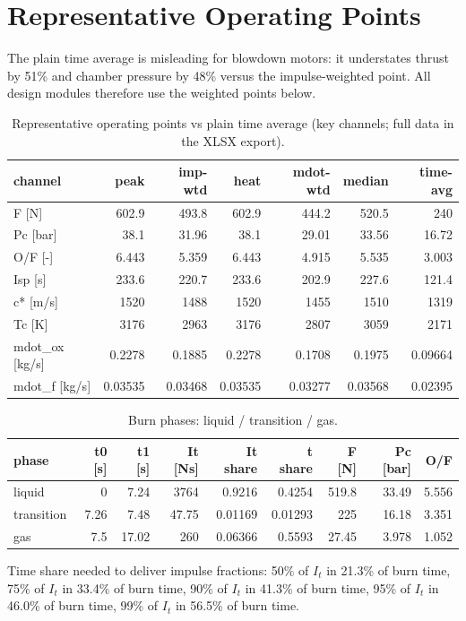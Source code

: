 \documentclass[11pt]{article}
\begin{document}
\section{Representative Operating Points}
The plain time average is misleading for blowdown motors: it understates thrust by 51\% and chamber pressure by 48\% versus the impulse-weighted point. All design modules therefore use the weighted points below.
\begin{table}[h!]\centering\small
\caption{Representative operating points vs plain time average (key channels; full data in the XLSX export).}
\begin{tabular}{lrrrrrr}\toprule
channel & peak & imp-wtd & heat & mdot-wtd & median & time-avg \\
\midrule
F [N] & 602.9 & 493.8 & 602.9 & 444.2 & 520.5 & 240 \\
Pc [bar] & 38.1 & 31.96 & 38.1 & 29.01 & 33.56 & 16.72 \\
O/F [-] & 6.443 & 5.359 & 6.443 & 4.915 & 5.535 & 3.003 \\
Isp [s] & 233.6 & 220.7 & 233.6 & 202.9 & 227.6 & 121.4 \\
c* [m/s] & 1520 & 1488 & 1520 & 1455 & 1510 & 1319 \\
Tc [K] & 3176 & 2963 & 3176 & 2807 & 3059 & 2171 \\
mdot\_ox [kg/s] & 0.2278 & 0.1885 & 0.2278 & 0.1708 & 0.1975 & 0.09664 \\
mdot\_f [kg/s] & 0.03535 & 0.03468 & 0.03535 & 0.03277 & 0.03568 & 0.02395 \\
\bottomrule\end{tabular}\end{table}
\begin{table}[h!]\centering\small
\caption{Burn phases: liquid / transition / gas.}
\begin{tabular}{lrrrrrrrr}\toprule
phase & t0 [s] & t1 [s] & It [Ns] & It share & t share & F [N] & Pc [bar] & O/F \\
\midrule
liquid & 0 & 7.24 & 3764 & 0.9216 & 0.4254 & 519.8 & 33.49 & 5.556 \\
transition & 7.26 & 7.48 & 47.75 & 0.01169 & 0.01293 & 225 & 16.18 & 3.351 \\
gas & 7.5 & 17.02 & 260 & 0.06366 & 0.5593 & 27.45 & 3.978 & 1.052 \\
\bottomrule\end{tabular}\end{table}
Time share needed to deliver impulse fractions: 50\% of $I_t$ in 21.3\% of burn time, 75\% of $I_t$ in 33.4\% of burn time, 90\% of $I_t$ in 41.3\% of burn time, 95\% of $I_t$ in 46.0\% of burn time, 99\% of $I_t$ in 56.5\% of burn time.
\end{document}
